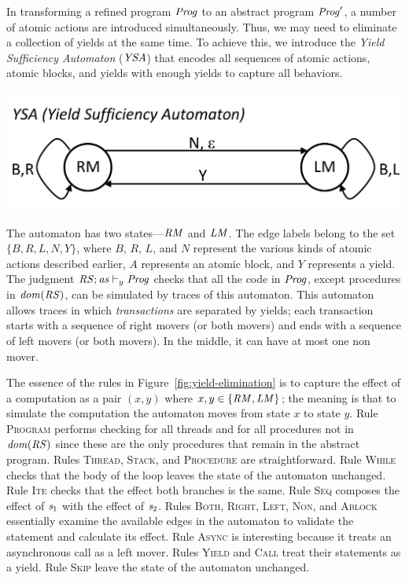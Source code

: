 In transforming a refined program $\mathit{Prog}$ to an abstract program $\mathit{Prog}'$, a number of atomic actions 
are introduced simultaneously.
Thus, we may need to eliminate a collection of yields at the same time.
To achieve this, we introduce the {\em Yield Sufficiency Automaton\/} ($\mathit{YSA}$) that encodes 
all sequences of atomic actions, atomic blocks, and yields with enough yields to capture all behaviors.
\begin{center}
\includegraphics[scale=0.35]{YieldTypeCheckingAutomaton.pdf}
\end{center}
The automaton has two states---$\mathit{RM}$ and $\mathit{LM}$.
The edge labels belong to the set $\{B,R,L,N,Y\}$, where $B$, $R$, $L$, and $N$ represent the various kinds 
of atomic actions described earlier, $A$ represents an atomic block, and $Y$ represents a yield.
The judgment $\mathit{RS};\mathit{as} \vdash_y \mathit{Prog}$ checks that all the code in $\mathit{Prog}$, except procedures in $\mathit{dom}(\mathit{RS})$,
can be simulated by traces of this automaton.
This automaton allows traces in which {\em transactions\/} are separated by yields;
each transaction starts with a sequence of right movers (or both movers) and ends with a sequence of left movers (or both movers).
In the middle, it can have at most one non mover.

The essence of the rules in Figure~\ref{fig:yield-elimination}
is to capture the effect of a computation as a pair $(x,y)$ where $x,y \in \{\mathit{RM},\mathit{LM}\}$;
the meaning is that to simulate the computation the automaton moves from state $x$ to state $y$.
Rule \textsc{Program} performs checking for all threads and for all procedures not in $\mathit{dom}(\mathit{RS})$ since these are the 
only procedures that remain in the abstract program.
Rules \textsc{Thread}, \textsc{Stack}, and \textsc{Procedure} are straightforward.
Rule \textsc{While} checks that the body of the loop leaves the state of the automaton unchanged.
Rule \textsc{Ite} checks that the effect both branches is the same.
Rule \textsc{Seq} composes the effect of $\mathit{s}_1$ with the effect of $\mathit{s}_2$.
Rules \textsc{Both}, \textsc{Right}, \textsc{Left}, \textsc{Non}, and \textsc{Ablock} essentially 
examine the available edges in the automaton to validate the statement and calculate its effect.
Rule \textsc{Async} is interesting because it treats an asynchronous call as a left mover.
Rules \textsc{Yield} and \textsc{Call} treat their statements as a yield.
Rule \textsc{Skip} leave the state of the automaton unchanged.

